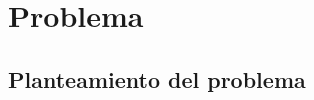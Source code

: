 \documentclass[11pt,lettersize]{article} %
\newcommand{\figura}[1]{\hyperref[{#1}]{figura \ref*{#1}}}
\begin{document}
\cleardoublepage
\section{Problema}
\label{S-problema}
\subsection{Planteamiento del problema}

%
%
\end{document}
